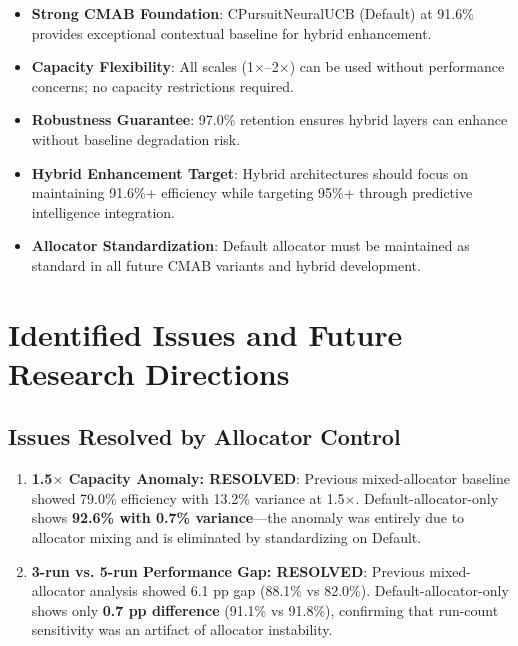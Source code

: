 \documentclass[12pt,a4paper]{article}
\newcommand{\success}[1]{\textcolor{successcolor}{\textbf{#1}}}
\begin{document}
\begin{itemize}
\item \textbf{Strong CMAB Foundation}: CPursuitNeuralUCB (Default) at 91.6\% provides exceptional contextual baseline for hybrid enhancement.

\item \textbf{Capacity Flexibility}: All scales (1$\times$--2$\times$) can be used without performance concerns; no capacity restrictions required.

\item \textbf{Robustness Guarantee}: 97.0\% retention ensures hybrid layers can enhance without baseline degradation risk.

\item \textbf{Hybrid Enhancement Target}: Hybrid architectures should focus on maintaining 91.6\%+ efficiency while targeting 95\%+ through predictive intelligence integration.

\item \textbf{Allocator Standardization}: Default allocator must be maintained as standard in all future CMAB variants and hybrid development.
\end{itemize}

\section{Identified Issues and Future Research Directions}

\subsection{Issues Resolved by Allocator Control}

\begin{enumerate}
\item \success{1.5$\times$ Capacity Anomaly: RESOLVED}: Previous mixed-allocator baseline showed 79.0\% efficiency with 13.2\% variance at 1.5$\times$. Default-allocator-only shows \success{92.6\% with 0.7\% variance}—the anomaly was entirely due to allocator mixing and is eliminated by standardizing on Default.

\item \success{3-run vs. 5-run Performance Gap: RESOLVED}: Previous mixed-allocator analysis showed 6.1 pp gap (88.1\% vs 82.0\%). Default-allocator-only shows only \success{0.7 pp difference} (91.1\% vs 91.8\%), confirming that run-count sensitivity was an artifact of allocator instability.
\end{enumerate}
\end{document}

